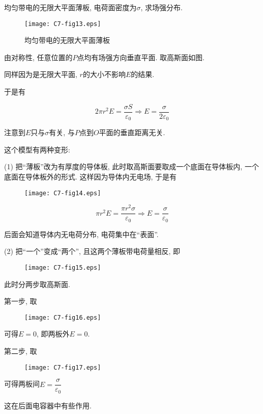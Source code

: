 \newpage

\begin{example}
	均匀带电的无限大平面薄板, 电荷面密度为$\sigma$, 求场强分布. 
	
	\begin{figure}[h]
		\centering
		\texttt{[image: C7-fig13.eps]}
		\caption{均匀带电的无限大平面薄板}
	\end{figure}
	
	\begin{solution}
		由对称性, 任意位置的$P$点均有场强方向垂直平面. 取高斯面如图. 
		
		同样因为是无限大平面, $r$的大小不影响$E$的结果. 
		
		于是有
		
		\begin{equation*}
			2 \pi r^2 E = \dfrac{\sigma S}{\varepsilon_0} \Rightarrow E = \dfrac{\sigma}{2\varepsilon_0}
		\end{equation*}
		
		注意到$E$只与$\sigma$有关, 与$P$点到$O$平面的垂直距离无关. 
		
	\end{solution}
	
\end{example}

\begin{note}
	
	这个模型有两种变形: 
	
	(1) 把“薄板”改为有厚度的导体板, 此时取高斯面要取成一个底面在导体板内, 一个底面在导体板外的形式. 这样因为导体内无电场, 于是有
	
	\begin{figure}[h]
		\centering
		\texttt{[image: C7-fig14.eps]}
	\end{figure}
	
	\begin{equation*}
		\pi r^2 E = \dfrac{\pi r^2 \sigma}{\varepsilon_0} \Rightarrow E = \dfrac{\sigma}{\varepsilon_0}
	\end{equation*}
	
	后面会知道导体内无电荷分布, 电荷集中在“表面”. 
	
	(2) 把“一个”变成“两个”, 且这两个薄板带电荷量相反, 即
	
	\begin{figure}[H]
		\centering
		\texttt{[image: C7-fig15.eps]}
	\end{figure}
	
	此时分两步取高斯面. 
	
	第一步, 取
	
	\begin{figure}[H]
		\centering
		\texttt{[image: C7-fig16.eps]}
	\end{figure}
	
	可得$E = 0$, 即两板外$E = 0$. 
	
	第二步, 取
	
	\begin{figure}[H]
		\centering
		\texttt{[image: C7-fig17.eps]}
	\end{figure}
	
	可得两板间$E = \dfrac{\sigma}{\varepsilon_0}$
	
	这在后面电容器中有些作用. 
\end{note}

